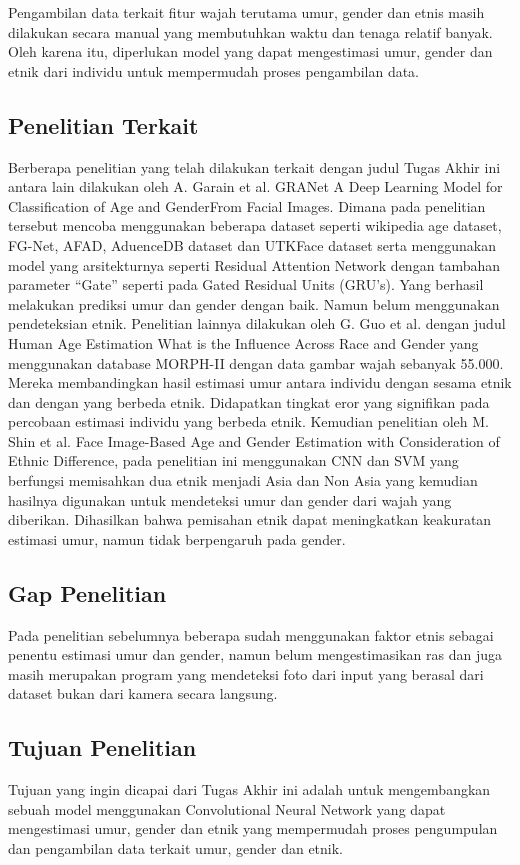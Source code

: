 Pengambilan data terkait fitur wajah terutama umur, gender dan etnis masih dilakukan secara manual yang 
membutuhkan waktu dan tenaga relatif banyak. Oleh karena itu, diperlukan model yang dapat mengestimasi 
umur, gender dan etnik dari individu untuk mempermudah proses pengambilan data.

\subsection{Penelitian Terkait}

Berberapa penelitian yang telah dilakukan terkait dengan judul Tugas Akhir ini antara lain dilakukan oleh 
A. Garain et al. GRANet A Deep Learning Model for Classification of Age and GenderFrom Facial Images. 
Dimana pada penelitian tersebut mencoba menggunakan beberapa dataset seperti wikipedia age dataset, 
FG-Net, AFAD, AduenceDB dataset dan UTKFace dataset serta menggunakan model yang arsitekturnya seperti 
Residual Attention Network dengan tambahan parameter “Gate” seperti pada Gated Residual Units (GRU’s). 
Yang berhasil melakukan prediksi umur dan gender dengan baik. Namun belum menggunakan pendeteksian etnik. 
Penelitian lainnya dilakukan oleh G. Guo et al. dengan judul Human Age Estimation What is the Influence 
Across Race and Gender yang menggunakan database MORPH-II dengan data gambar wajah sebanyak 55.000. 
Mereka membandingkan hasil estimasi umur antara individu dengan sesama etnik dan dengan yang berbeda 
etnik. Didapatkan tingkat eror yang signifikan pada percobaan estimasi individu  yang  berbeda etnik. 
Kemudian penelitian oleh M. Shin et al. Face Image-Based Age and Gender Estimation with Consideration of 
Ethnic Difference, pada penelitian ini menggunakan CNN dan SVM yang berfungsi memisahkan dua etnik 
menjadi Asia dan Non Asia yang kemudian hasilnya digunakan untuk mendeteksi umur dan gender dari wajah 
yang diberikan. Dihasilkan bahwa pemisahan etnik dapat meningkatkan keakuratan estimasi umur, namun tidak 
berpengaruh pada gender.

\subsection{Gap Penelitian}
Pada penelitian sebelumnya beberapa sudah menggunakan faktor etnis sebagai penentu estimasi umur dan 
gender, namun belum mengestimasikan ras dan juga masih merupakan program yang mendeteksi foto dari input 
yang berasal dari dataset bukan dari kamera secara langsung.

\subsection{Tujuan Penelitian}

Tujuan yang ingin dicapai dari Tugas Akhir ini adalah untuk mengembangkan sebuah model menggunakan 
Convolutional Neural Network yang dapat mengestimasi umur, gender dan etnik yang mempermudah proses 
pengumpulan dan pengambilan data terkait umur, gender dan etnik.